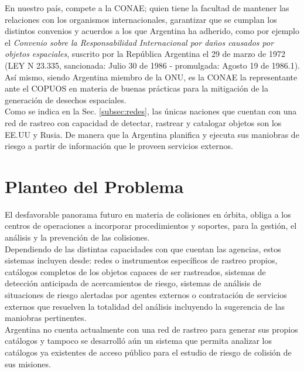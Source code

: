 En nuestro pa\'is, compete a la CONAE; quien tiene la facultad de mantener las relaciones con los organismos internacionales, garantizar que se cumplan los distintos convenios y acuerdos a los que Argentina ha adherido, como por ejemplo el {\it{Convenio sobre la Responsabilidad Internacional por da\~nos causados por objetos espaciales}}, suscrito por la Rep\'ublica Argentina el 29 de marzo de 1972 (LEY N 23.335, sancionada: Julio 30 de 1986 - promulgada: Agosto 19 de 1986.1).\\

As\'i mismo, siendo Argentina miembro de la ONU, es la CONAE la representante ante el COPUOS en materia de buenas pr\'acticas para la mitigaci\'on de la generaci\'on de desechos espaciales.\\

Como se indica en la Sec. \ref{subsec:redes}, las \'unicas naciones que cuentan con una red de rastreo con capacidad de detectar, rastrear y catalogar objetos son los EE.UU y Rusia. De manera que la Argentina planifica y ejecuta sus maniobras de riesgo a partir de informaci\'on que le proveen servicios externos.\\

\section{Planteo del Problema}

El desfavorable panorama futuro en materia de colisiones en \'orbita, obliga a los centros de operaciones a incorporar procedimientos y soportes, para la gesti\'on, el an\'alisis y la prevenci\'on de las colisiones.\\

Dependiendo de las distintas capacidades con que cuentan las agencias, estos sistemas incluyen desde: redes o instrumentos espec\'ificos de rastreo propios, cat\'alogos completos de los objetos capaces de ser rastreados, sistemas de detecci\'on anticipada de acercamientos de riesgo, sistemas de an\'alisis de situaciones de riesgo alertadas por agentes externos o contrataci\'on de servicios externos que resuelven la totalidad del an\'alisis incluyendo la sugerencia de las maniobras pertinentes.\\

Argentina no cuenta actualmente con una red de rastreo para generar sus propios cat\'alogos y tampoco se desarroll\'o a\'un un sistema que permita
analizar los cat\'alogos ya existentes de acceso p\'ublico para el estudio de riesgo de colisi\'on de sus misiones.\\

